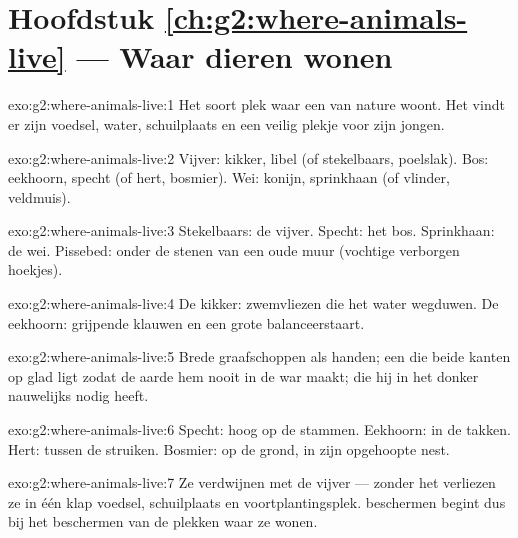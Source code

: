 \section*{Hoofdstuk \ref{ch:g2:where-animals-live} --- Waar dieren wonen}

\begin{solution}{exo:g2:where-animals-live:1}
Het soort plek waar een  van nature woont. Het vindt er zijn
voedsel, water, schuilplaats en een veilig plekje voor zijn jongen.
\end{solution}

\begin{solution}{exo:g2:where-animals-live:2}
Vijver: kikker, libel (of stekelbaars, poelslak). Bos: eekhoorn, specht
(of hert, bosmier). Wei: konijn, sprinkhaan (of vlinder, veldmuis).
\end{solution}

\begin{solution}{exo:g2:where-animals-live:3}
Stekelbaars: de vijver. Specht: het bos. Sprinkhaan: de wei. Pissebed:
onder de stenen van een oude muur (vochtige verborgen hoekjes).
\end{solution}

\begin{solution}{exo:g2:where-animals-live:4}
De kikker: zwemvliezen die het water wegduwen. De eekhoorn: grijpende
klauwen en een grote balanceerstaart.
\end{solution}

\begin{solution}{exo:g2:where-animals-live:5}
Brede graafschoppen als handen; een  die beide kanten op glad
ligt zodat de aarde hem nooit in de war maakt;  die hij in het
donker nauwelijks nodig heeft.
\end{solution}

\begin{solution}{exo:g2:where-animals-live:6}
Specht: hoog op de stammen. Eekhoorn: in de takken. Hert: tussen de
struiken. Bosmier: op de grond, in zijn opgehoopte nest.
\end{solution}

\begin{solution}{exo:g2:where-animals-live:7}
Ze verdwijnen met de vijver --- zonder het  verliezen ze in
één klap voedsel, schuilplaats en voortplantingsplek.  beschermen
begint dus bij het beschermen van de plekken waar ze wonen.
\end{solution}


